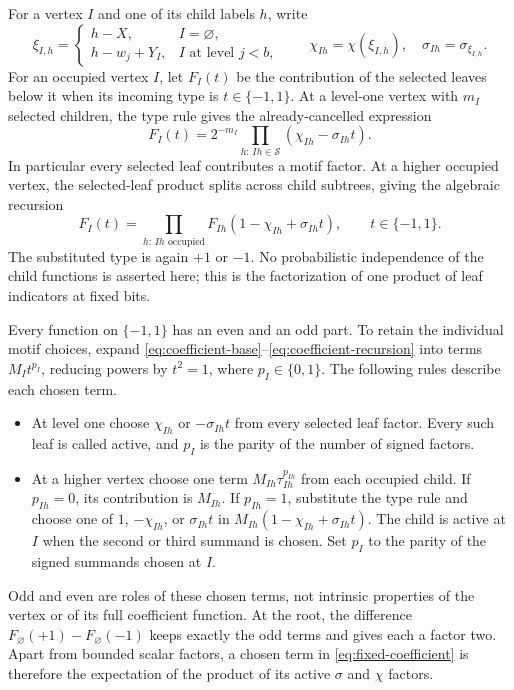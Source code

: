 For a vertex $I$ and one of its child labels $h$, write
\[
 \xi_{I,h}=\begin{cases}h-X,&I=\varnothing,\\
 h-w_j+Y_I,&I\text{ at level }j<b,
 \end{cases}
 \qquad \chi_{Ih}=\chi(\xi_{I,h}),\quad
 \sigma_{Ih}=\sigma_{\xi_{I,h}}.
\]
For an occupied vertex $I$, let $F_I(t)$ be the contribution of the selected leaves below it when its incoming type is $t\in\{-1,1\}$.  At a level-one vertex with $m_I$ selected children, the type rule gives the already-cancelled expression
\begin{equation}\label{eq:coefficient-base}
 F_I(t)=2^{-m_I}\prod_{h:\,Ih\in\mathcal S}
       (\chi_{Ih}-\sigma_{Ih}t).
\end{equation}
In particular every selected leaf contributes a motif factor.  At a higher occupied vertex, the selected-leaf product splits across child subtrees, giving the algebraic recursion
\begin{equation}\label{eq:coefficient-recursion}
 F_I(t)=\prod_{h:\,Ih\text{ occupied}}
       F_{Ih}(1-\chi_{Ih}+\sigma_{Ih}t),\qquad t\in\{-1,1\}.
\end{equation}
The substituted type is again $+1$ or $-1$.  No probabilistic independence of the child functions is asserted here; this is the factorization of one product of leaf indicators at fixed bits.

Every function on $\{-1,1\}$ has an even and an odd part.  To retain the individual motif choices, expand \eqref{eq:coefficient-base}--\eqref{eq:coefficient-recursion} into terms $M_I t^{p_I}$, reducing powers by $t^2=1$, where $p_I\in\{0,1\}$.  The following rules describe each chosen term.
\begin{itemize}
\item At level one choose $\chi_{Ih}$ or $-\sigma_{Ih}t$ from every selected leaf factor.  Every such leaf is called active, and $p_I$ is the parity of the number of signed factors.
\item At a higher vertex choose one term $M_{Ih}\tau_{Ih}^{p_{Ih}}$ from each occupied child.  If $p_{Ih}=0$, its contribution is $M_{Ih}$.  If $p_{Ih}=1$, substitute the type rule and choose one of $1$, $-\chi_{Ih}$, or $\sigma_{Ih}t$ in
$M_{Ih}(1-\chi_{Ih}+\sigma_{Ih}t)$.  The child is active at $I$ when the second or third summand is chosen.  Set $p_I$ to the parity of the signed summands chosen at $I$.
\end{itemize}
Odd and even are roles of these chosen terms, not intrinsic properties of the vertex or of its full coefficient function.  At the root, the difference $F_\varnothing(+1)-F_\varnothing(-1)$ keeps exactly the odd terms and gives each a factor two.  Apart from bounded scalar factors, a chosen term in \eqref{eq:fixed-coefficient} is therefore the expectation of the product of its active $\sigma$ and $\chi$ factors.

